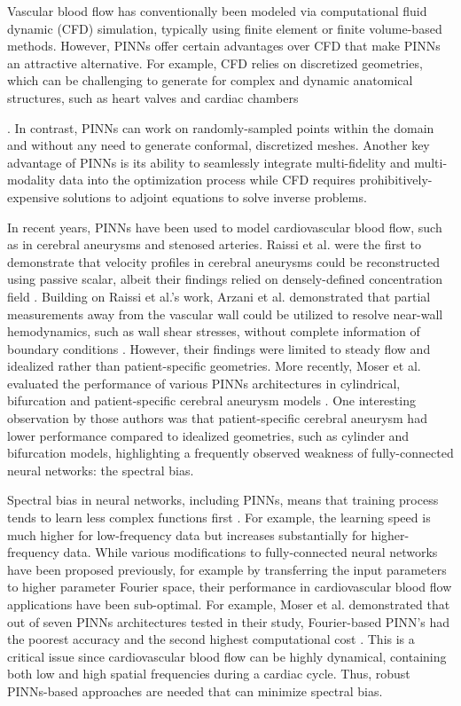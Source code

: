 \documentclass[times,twocolumn,final]{elsarticle}
\begin{document}
Vascular blood flow has conventionally been modeled via computational fluid dynamic (CFD) simulation, typically using finite element or finite volume-based methods. However, PINNs offer certain advantages over CFD that make PINNs an attractive alternative. For example, CFD relies on discretized geometries, which can be challenging to generate for complex and dynamic anatomical structures, such as heart valves and cardiac chambers {\citep{Mittal2016_Review}.  In contrast, PINNs can work on randomly-sampled points within the domain and without any need to generate conformal, discretized meshes. Another key advantage of PINNs is its ability to seamlessly integrate multi-fidelity and multi-modality data into the optimization process while CFD requires prohibitively-expensive solutions to adjoint equations to solve inverse problems. 

In recent years, PINNs have been used to model cardiovascular blood flow, such as in cerebral aneurysms and stenosed arteries. Raissi et al. were the first to demonstrate that velocity profiles in cerebral aneurysms could be reconstructed using passive scalar, albeit their findings relied on densely-defined concentration field \citep{Raissi2020_PINNs}. Building on Raissi et al.'s work, Arzani et al. demonstrated that partial measurements away from the vascular wall could be utilized to resolve near-wall hemodynamics, such as wall shear stresses, without complete information of boundary conditions \citep{Arzani2021_PINNs}. However, their findings were limited to steady flow and idealized rather than patient-specific geometries. More recently, Moser et al. evaluated the performance of various PINNs architectures in cylindrical, bifurcation and patient-specific cerebral aneurysm models \citep{Moser2023_PINNs}. One interesting observation by those authors was that patient-specific cerebral aneurysm had lower performance compared to idealized geometries, such as cylinder and bifurcation models, highlighting a frequently observed weakness of fully-connected neural networks: the spectral bias.

Spectral bias in neural networks, including PINNs, means that training process tends to learn less complex functions first \citep{Rahman2019_PINNs}. For example, the learning speed is much higher for low-frequency data but increases substantially for higher-frequency data. While various modifications to fully-connected neural networks have been proposed previously, for example by transferring the input parameters to higher parameter Fourier space, their performance in cardiovascular blood flow applications have been sub-optimal. For example, Moser et al. demonstrated that out of seven PINNs architectures tested in their study, Fourier-based PINN's had the poorest accuracy and the second highest computational cost \citep{Moser2023_PINNs}. This is a critical issue since cardiovascular blood flow can be highly dynamical, containing both low and high spatial frequencies during a cardiac cycle. Thus, robust PINNs-based approaches are needed that can minimize spectral bias. 

}
\end{document}
